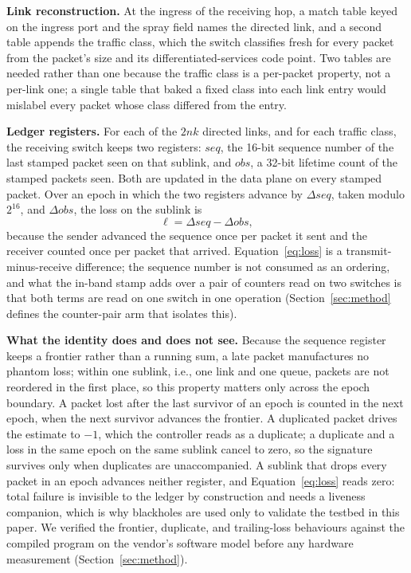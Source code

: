 \textbf{Link reconstruction.} At the ingress of the receiving hop, a match table keyed on the ingress port and the spray field names the directed link, and a second table appends the traffic class, which the switch classifies fresh for every packet from the packet's size and its differentiated-services code point. Two tables are needed rather than one because the traffic class is a per-packet property, not a per-link one; a single table that baked a fixed class into each link entry would mislabel every packet whose class differed from the entry.

\textbf{Ledger registers.} For each of the $2nk$ directed links, and for each traffic class, the receiving switch keeps two registers: $\mathit{seq}$, the 16-bit sequence number of the last stamped packet seen on that sublink, and $\mathit{obs}$, a 32-bit lifetime count of the stamped packets seen. Both are updated in the data plane on every stamped packet. Over an epoch in which the two registers advance by $\Delta\mathit{seq}$, taken modulo $2^{16}$, and $\Delta\mathit{obs}$, the loss on the sublink is
\begin{equation}
\ell = \Delta\mathit{seq} - \Delta\mathit{obs},
\label{eq:loss}
\end{equation}
because the sender advanced the sequence once per packet it sent and the receiver counted once per packet that arrived. Equation~\eqref{eq:loss} is a transmit-minus-receive difference; the sequence number is not consumed as an ordering, and what the in-band stamp adds over a pair of counters read on two switches is that both terms are read on one switch in one operation (Section~\ref{sec:method} defines the counter-pair arm that isolates this).

\textbf{What the identity does and does not see.} Because the sequence register keeps a frontier rather than a running sum, a late packet manufactures no phantom loss; within one sublink, i.e., one link and one queue, packets are not reordered in the first place, so this property matters only across the epoch boundary. A packet lost after the last survivor of an epoch is counted in the next epoch, when the next survivor advances the frontier. A duplicated packet drives the estimate to $-1$, which the controller reads as a duplicate; a duplicate and a loss in the same epoch on the same sublink cancel to zero, so the signature survives only when duplicates are unaccompanied. A sublink that drops every packet in an epoch advances neither register, and Equation~\eqref{eq:loss} reads zero: total failure is invisible to the ledger by construction and needs a liveness companion, which is why blackholes are used only to validate the testbed in this paper. We verified the frontier, duplicate, and trailing-loss behaviours against the compiled program on the vendor's software model before any hardware measurement (Section~\ref{sec:method}).

